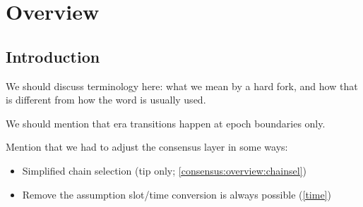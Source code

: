 \chapter{Overview}
\label{hfc}

\section{Introduction}
\label{hfc:intro}

\todo{} We should discuss terminology here: what we mean by a hard fork,
and how that is different from how the word is usually used.

We should mention that era transitions happen at epoch boundaries only.

Mention that we had to adjust the consensus layer in some ways:

\begin{itemize}
\item Simplified chain selection (tip only; \cref{consensus:overview:chainsel})
\item Remove the assumption slot/time conversion is always possible (\cref{time})
\end{itemize}
